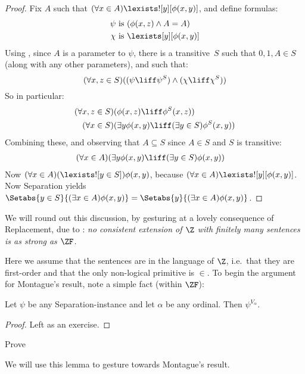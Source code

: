 \documentclass[../../../include/open-logic-section]{subfiles}
\begin{document}
\begin{proof}
Fix $A$ such that $(\forall x \in A)\lexists![y][\phi(x,y)]$, and
define formulas:
\begin{align*}
	\psi &\text{ is } (\phi(x, z) \land A = A)\\
	\chi &\text{ is } \lexists[y][\phi(x, y)]
\end{align*}
Using , since $A$ is a parameter to $\psi$, there
is a transitive~$S$ such that $0, 1, A \in S$  (along with any other
parameters), and such that:
\[
	(\forall x,z \in S)((\psi \liff \psi^S) \land (\chi \liff \chi^S))
\]
So in particular:
\begin{align*}
	(\forall  x, z \in S)(&\phi(x, z) \liff \phi^S(x, z))\\
	(\forall x \in S)(&\exists y\phi(x, y) \liff (\exists y \in S)\phi^S(x, y)) 
\end{align*}
Combining these, and observing that $A \subseteq S$ since $A \in S$ and $S$ is transitive:
\begin{align*}
	(\forall x \in A)(&\exists y\phi(x, y) \liff (\exists y \in S)\phi(x, y))
\end{align*}
Now $(\forall x \in A)(\lexists![y \in S])\phi(x, y)$, because
$(\forall x \in A)\lexists![y][\phi(x, y)]$. Now Separation yields
$\Setabs{y \in S}{(\exists x \in A) \phi(x, y)} = \Setabs{y}{(\exists
x \in A) \phi(x, y)}$. 
\end{proof}

We will round out this discussion, by gesturing at a lovely consequence of Replacement, due to \citet{Montague1961}: \emph{no consistent extension of $\Z$ with finitely many sentences is as strong as $\ZF$.} 

Here we assume that the sentences are in the language of $\Z$, i.e.\ that they are first-order and that the only non-logical primitive is $\in$. To begin the argument for Montague's result, note a simple fact (within $\ZF$): 
\begin{lem}
	Let $\psi$ be any Separation-instance and let $\alpha$ be any ordinal. Then $\psi^{V_\alpha}$.
\end{lem}
\begin{proof}
	Left as an exercise.
\end{proof}
\begin{prob}
	Prove 	
\end{prob}
\noindent
We will use this lemma to gesture towards Montague's result. 
\end{document}

